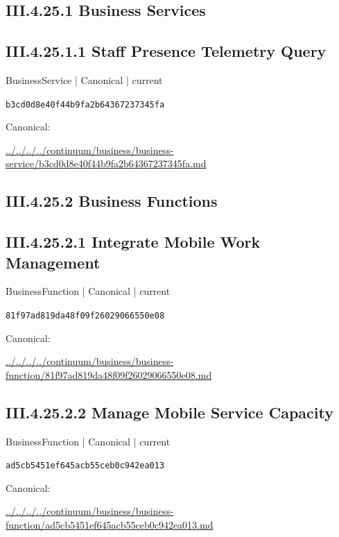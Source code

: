 \documentclass[10pt,a4paper]{article}
\begin{document}
\subsection*{III.4.25.1 Business Services}
\subsection*{III.4.25.1.1 Staff Presence Telemetry Query}
{\small BusinessService | Canonical | current}\par
\texttt{b3cd0d8e40f44b9fa2b64367237345fa}\par
Canonical: \par
{\footnotesize\url{../../../../continuum/business/business-service/b3cd0d8e40f44b9fa2b64367237345fa.md}}\par
\subsection*{III.4.25.2 Business Functions}
\subsection*{III.4.25.2.1 Integrate Mobile Work Management}
{\small BusinessFunction | Canonical | current}\par
\texttt{81f97ad819da48f09f26029066550e08}\par
Canonical: \par
{\footnotesize\url{../../../../continuum/business/business-function/81f97ad819da48f09f26029066550e08.md}}\par
\subsection*{III.4.25.2.2 Manage Mobile Service Capacity}
{\small BusinessFunction | Canonical | current}\par
\texttt{ad5cb5451ef645acb55ceb0c942ea013}\par
Canonical: \par
{\footnotesize\url{../../../../continuum/business/business-function/ad5cb5451ef645acb55ceb0c942ea013.md}}\par
\end{document}

